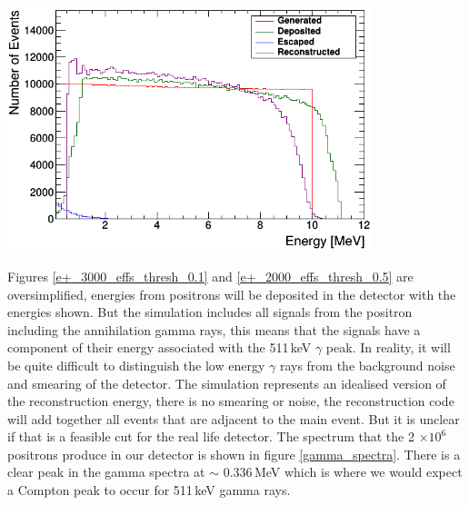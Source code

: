 \documentclass[12pt,a4paper]{article}
\newenvironment{Figure}
  {\par\medskip\noindent\minipage{\linewidth}}
  {\endminipage\par\medskip}
\begin{document}
\begin{Figure}
 \centering
 \includegraphics[height=71mm]{inverseBRun2000_data_storage_thresh0_5.png}
 \label{e+_2000_effs_thresh_0.5}
\end{Figure}

Figures \ref{e+_3000_effs_thresh_0.1} and \ref{e+_2000_effs_thresh_0.5} are oversimplified, energies from positrons will be deposited in the detector with the energies shown. But the simulation includes all signals from the positron including the annihilation gamma rays, this means that the signals have a component of their energy associated with the 511\,keV $\gamma$ peak. In reality, it will be quite difficult to distinguish the low energy $\gamma$ rays from the background noise and smearing of the detector. The simulation represents an idealised version of the reconstruction energy, there is no smearing or noise, the reconstruction code will add together all events that are adjacent to the main event. But it is unclear if that is a feasible cut for the real life detector. The spectrum that the 2 $\times 10^6$  positrons produce in our detector is shown in figure \ref{gamma_spectra}. There is a clear peak in the gamma spectra at $\sim$ 0.336\,MeV which is where we would expect a Compton peak to occur for 511\,keV gamma rays. 
\end{document}
